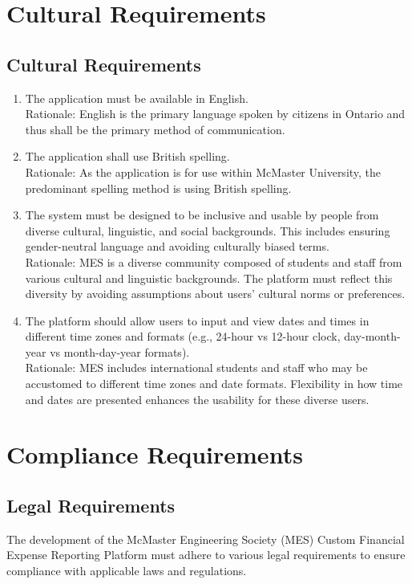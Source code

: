 \documentclass[12pt]{article}
\begin{document}
\section{Cultural Requirements}
\subsection{Cultural Requirements}
\begin{enumerate}
  \item The application must be available in English. \\
  Rationale: English is the primary language spoken by citizens in Ontario and thus shall be the primary method of communication.
  \item The application shall use British spelling. \\
  Rationale: As the application is for use within McMaster University, the predominant spelling method is using British spelling.
  \item The system must be designed to be inclusive and usable by people from diverse cultural, linguistic, and social backgrounds. This includes ensuring gender-neutral language and avoiding culturally biased terms. \\
  Rationale:  MES is a diverse community composed of students and staff from various cultural and linguistic backgrounds. The platform must reflect this diversity by avoiding assumptions about users' cultural norms or preferences.
  \item The platform should allow users to input and view dates and times in different time zones and formats (e.g., 24-hour vs 12-hour clock, day-month-year vs month-day-year formats). \\
  Rationale: MES includes international students and staff who may be accustomed to different time zones and date formats. Flexibility in how time and dates are presented enhances the usability for these diverse users.
\end{enumerate}

\section{Compliance Requirements}

\subsection{Legal Requirements}
The development of the McMaster Engineering Society (MES) Custom Financial Expense Reporting Platform must adhere to various legal requirements to ensure compliance with applicable laws and regulations.
\end{document}
